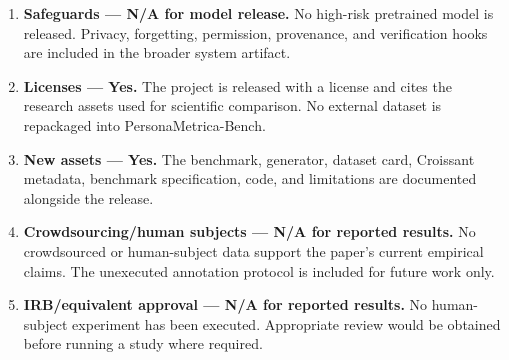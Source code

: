 \documentclass[
  10pt,
  letterpaper,
]{article}
\begin{document}
\begin{enumerate}
  plus mitigations in the system artifact.
\item
  \textbf{Safeguards --- N/A for model release.} No high-risk pretrained
  model is released. Privacy, forgetting, permission, provenance, and
  verification hooks are included in the broader system artifact.
\item
  \textbf{Licenses --- Yes.} The project is released with a license and
  cites the research assets used for scientific comparison. No external
  dataset is repackaged into PersonaMetrica-Bench.
\item
  \textbf{New assets --- Yes.} The benchmark, generator, dataset card,
  Croissant metadata, benchmark specification, code, and limitations are
  documented alongside the release.
\item
  \textbf{Crowdsourcing/human subjects --- N/A for reported results.} No
  crowdsourced or human-subject data support the paper's current
  empirical claims. The unexecuted annotation protocol is included for
  future work only.
\item
  \textbf{IRB/equivalent approval --- N/A for reported results.} No
  human-subject experiment has been executed. Appropriate review would
  be obtained before running a study where required.
\end{enumerate}
\end{document}
